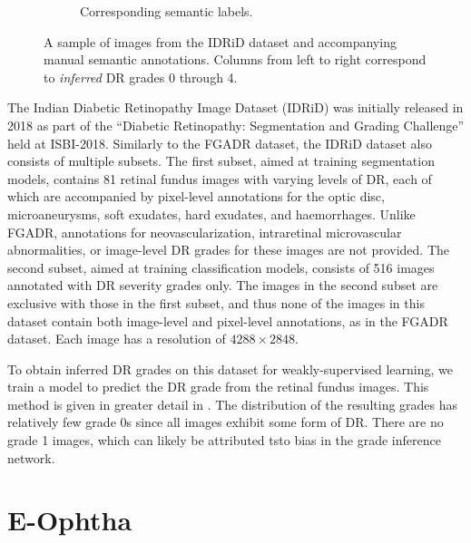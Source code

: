 \begin{figure}[h]
\begin{subfigure}{0.45\textwidth}
        \caption{Corresponding semantic labels.}
        \label{fig:idrid_sample_label}
    \end{subfigure}
        \caption{A sample of images from the IDRiD dataset and accompanying manual semantic annotations. Columns from left to right correspond to \emph{inferred} DR grades 0 through 4.}
    \label{fig:idrid_sample}
\end{figure}

The Indian Diabetic Retinopathy Image Dataset (IDRiD) \cite{Porwal2018} was initially released in 2018 as part of the ``Diabetic Retinopathy: Segmentation and Grading Challenge'' held at ISBI-2018.
Similarly to the FGADR dataset, the IDRiD dataset also consists of multiple subsets.
The first subset, aimed at training segmentation models, contains 81 retinal fundus images with varying levels of DR, each of which are accompanied by pixel-level annotations for the optic disc, microaneurysms, soft exudates, hard exudates, and haemorrhages.
Unlike FGADR, annotations for neovascularization, intraretinal microvascular abnormalities, or image-level DR grades for these images are not provided.
The second subset, aimed at training classification models, consists of 516 images annotated with DR severity grades only.
The images in the second subset are exclusive with those in the first subset, and thus none of the images in this dataset contain both image-level and pixel-level annotations, as in the FGADR dataset.
Each image has a resolution of $4288\times 2848$.

To obtain inferred DR grades on this dataset for weakly-supervised learning, we train a model to predict the DR grade from the retinal fundus images.
This method is given in greater detail in .
The distribution of the resulting grades has relatively few grade 0s since all images exhibit some form of DR.
There are no grade 1 images, which can likely be attributed tsto bias in the grade inference network.

\section{E-Ophtha}

